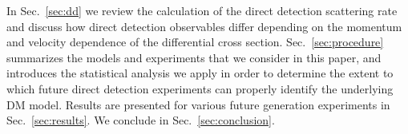 \documentclass[11pt]{article}
\newcommand{\Sec}[1]{Sec.~\ref{#1}} \newcommand{\Secs}[2]{Secs.~\ref{#1} and \ref{#2}} \newcommand{\Secm}[2]{Secs.~\ref{#1} through \ref{#2}}
\newcommand{\sjwColor}{red}
\newcommand{\sjwtt}[1]{{\color{\sjwColor}\tt #1}}
\begin{document}







In \Sec{sec:dd} we review the calculation of the direct detection scattering rate and discuss how direct detection observables differ depending on the momentum and velocity dependence of the differential cross section. \Sec{sec:procedure} summarizes the models and experiments that we consider in this paper, and introduces the statistical analysis we apply in order to determine the extent to which future direct detection experiments can properly identify the underlying DM model. Results are presented for various future generation experiments in \Sec{sec:results}. We conclude in \Sec{sec:conclusion}.
\end{document}
